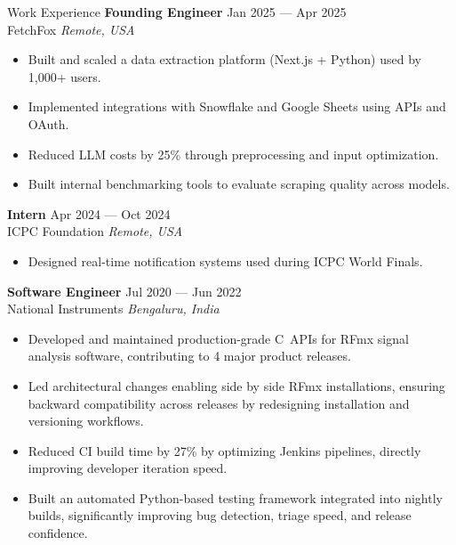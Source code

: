 \documentclass{resume}
\newcommand{\CPP}{C\nolinebreak[4]\hspace{-.05em}\raisebox{.25ex}{\footnotesize\bf ++}}
\begin{document}
\begin{rSection}{Work Experience}
        \textbf{Founding Engineer} \hfill Jan 2025 --- Apr 2025 \\
        FetchFox \hfill \textit{Remote, USA}
        \begin{itemize}
            \item Built and scaled a data extraction platform (Next.js + Python) used by 1,000+ users.
            \item Implemented integrations with Snowflake and Google Sheets using APIs and OAuth.
            \item Reduced LLM costs by 25\% through preprocessing and input optimization.
            \item Built internal benchmarking tools to evaluate scraping quality across models.
        \end{itemize}

        \textbf{Intern} \hfill Apr 2024 --- Oct 2024 \\
        ICPC Foundation \hfill \textit{Remote, USA}
        \begin{itemize}
            \item Designed real-time notification systems used during ICPC World Finals.
        \end{itemize}

        \textbf{Software Engineer} \hfill Jul 2020 --- Jun 2022 \\
        National Instruments \hfill \textit{Bengaluru, India}
        \begin{itemize}
            \item Developed and maintained production-grade \CPP\ APIs for RFmx signal analysis software, contributing to 4 major product releases.
            \item Led architectural changes enabling side by side RFmx installations, ensuring backward compatibility across releases by redesigning installation and versioning workflows.
            \item Reduced CI build time by 27\% by optimizing Jenkins pipelines, directly improving developer iteration speed.
            \item Built an automated Python-based testing framework integrated into nightly builds, significantly improving bug detection, triage speed, and release confidence.
        \end{itemize}
    \end{rSection}
\end{document}
